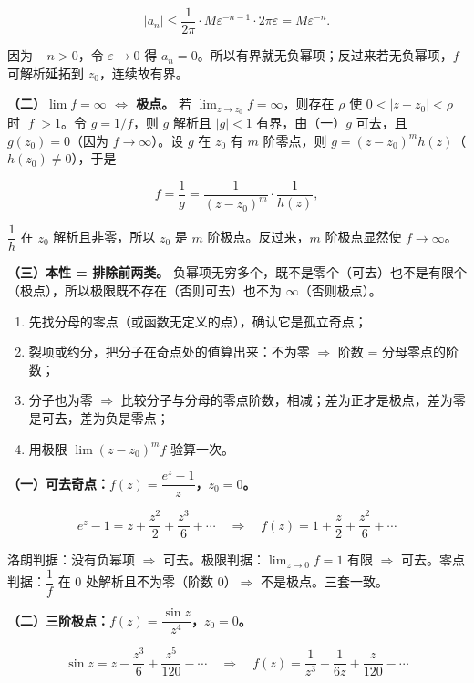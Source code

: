 \documentclass[11pt]{ctexart}
\let\origsubhdr\subhdr
\renewcommand{\subhdr}[1]{\par\needspace{4\baselineskip}\origsubhdr{#1}}
\begin{document}
\[ |a_n|\le\frac{1}{2\pi}\cdot M\varepsilon^{-n-1}\cdot2\pi\varepsilon=M\varepsilon^{-n} . \]

因为 $-n>0$，令 $\varepsilon\to0$ 得 $a_n=0$。所以有界就无负幂项；反过来若无负幂项，$f$ 可解析延拓到 $z_0$，连续故有界。

\textbf{（二）$\lim f=\infty$ $\iff$ 极点。}
若 $\lim_{z\to z_0}f=\infty$，则存在 $\rho$ 使 $0<|z-z_0|<\rho$ 时 $|f|>1$。令 $g=1/f$，则 $g$ 解析且 $|g|<1$ 有界，由（一）$g$ 可去，且 $g(z_0)=0$（因为 $f\to\infty$）。设 $g$ 在 $z_0$ 有 $m$ 阶零点，则 $g=(z-z_0)^m h(z)$（$h(z_0)\ne0$），于是

\[ f=\frac{1}{g}=\frac{1}{(z-z_0)^m}\cdot\frac{1}{h(z)} , \]

$\dfrac1h$ 在 $z_0$ 解析且非零，所以 $z_0$ 是 $m$ 阶极点。反过来，$m$ 阶极点显然使 $f\to\infty$。

\textbf{（三）本性 = 排除前两类。}
负幂项无穷多个，既不是零个（可去）也不是有限个（极点），所以极限既不存在（否则可去）也不为 $\infty$（否则极点）。



\begin{enumerate}
\item 先找分母的零点（或函数无定义的点），确认它是孤立奇点；
\item 裂项或约分，把分子在奇点处的值算出来：不为零 $\Rightarrow$ 阶数 = 分母零点的阶数；
\item 分子也为零 $\Rightarrow$ 比较分子与分母的零点阶数，相减；差为正才是极点，差为零是可去，差为负是零点；
\item 用极限 $\lim(z-z_0)^mf$ 验算一次。
\end{enumerate}


\textbf{（一）可去奇点：$f(z)=\dfrac{e^z-1}{z}$，$z_0=0$。}

\[ e^z-1=z+\frac{z^2}{2}+\frac{z^3}{6}+\cdots\quad\Longrightarrow\quad f(z)=1+\frac z2+\frac{z^2}{6}+\cdots \]

洛朗判据：没有负幂项 $\Rightarrow$ 可去。极限判据：$\lim_{z\to0}f=1$ 有限 $\Rightarrow$ 可去。零点判据：$\dfrac1f$ 在 $0$ 处解析且不为零（阶数 0）$\Rightarrow$ 不是极点。三套一致。

\textbf{（二）三阶极点：$f(z)=\dfrac{\sin z}{z^4}$，$z_0=0$。}

\[ \sin z=z-\frac{z^3}{6}+\frac{z^5}{120}-\cdots\quad\Longrightarrow\quad f(z)=\frac{1}{z^3}-\frac{1}{6z}+\frac{z}{120}-\cdots \]
\end{document}
